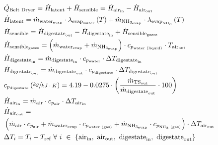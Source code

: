 \begin{refsection}[referencesApD]
\begin{align}
& \dot{Q}_{\text{Belt Dryer}} = \dot{H}_{\text{latent}} + \dot{H}_{\text{sensible}} = \dot{H}_{\text{air}_{\text{in}}} - \dot{H}_{\text{air}_{\text{out}}} \label{eq:BD1} 
\\
& \dot{H}_{\text{latent}} = \dot{m}_{\text{water}_\text{evap}} \cdot \lambda_{\text{evap}_{\text{water}}}\left(T\right) + \dot{m}_{\text{NH}_{3_\text{evap}}} \cdot \lambda_{\text{evap}_{\text{NH}_3}}\left(T\right) \label{eq:BD2} 
\\
& \dot{H}_{\text{sensible}} = \dot{H}_{\text{digestate}_\text{out}} - \dot{H}_{\text{digestate}_\text{in}} + \dot{H}_{\text{sensible}_{\text{gases}}} \label{eq:BD3} \\
& \dot{H}_{\text{sensible}_{\text{gases}}} = \left( \dot{m}_{\text{water}_\text{evap}} + \dot{m}_{\text{NH}_{3_\text{evap}}} \right) \cdot c_{p_{\text{water (liquid)}}} \cdot T_{\text{air}_\text{out}} \label{eq:BD4} 
\\
& \dot{H}_{\text{digestate}_{\text{in}}} = \dot{m}_{\text{digestate}_{\text{in}}} \cdot c_{p_{\text{water}}} \cdot \Delta T_{\text{digestate}_\text{in}} \label{eq:BD5} 
\\
& \dot{H}_{\text{digestate}_{\text{out}}} = \dot{m}_{\text{digestate}_{\text{out}}} \cdot c_{p_{\text{digestate}}} \cdot \Delta T_{\text{digestate}_\text{out}} \label{eq:BD6} 
\\
& c_{p_{\text{digestate}}} \left(\sfrac{kg}{kJ \cdot K}\right)= 4.19-0.0275 \cdot \left(\frac{\dot{m}_{\text{TS}_{\text{out}}}}{\dot{m}_{\text{digestate}_{\text{out}}}} \cdot 100 \right) \label{eq:BD7} 
\\	
& \dot{H}_{\text{air}_{\text{in}}} = \dot{m}_{\text{air}} \cdot c_{p_{\text{air}}} \cdot \Delta T_{\text{air}_\text{in}} \label{eq:BD8} 
\\	
& \dot{H}_{\text{air}_{\text{out}}} = \label{eq:BD9} \\
& \left(\dot{m}_{\text{air}} \cdot c_{p_{\text{air}}} + \dot{m}_{\text{water}_\text{evap}} \cdot c_{p_{\text{water (gas)}}} + \dot{m}_{\text{NH}_{3_\text{evap}}} \cdot c_{p_{\text{NH\textsubscript{3} (gas)}}} \right) \cdot \Delta T_{\text{air}_\text{out}} \nonumber 
\\	
& \Delta T_i = T_i - T_\text{ref} \ \forall \ i \ \in \ \{\text{air}_\text{in}, \ \text{air}_\text{out},  \ \text{digestate}_\text{in}, \ \text{digestate}_\text{out} \} \label{eq:BD10}
\end{align}


\end{refsection}
